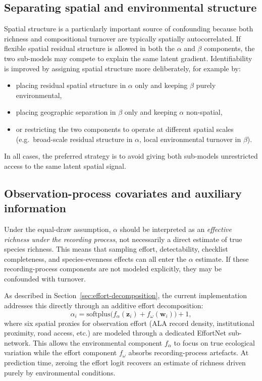 \documentclass{article}
\begin{document}
\subsection{Separating spatial and environmental structure}

Spatial structure is a particularly important source of confounding because both richness and compositional turnover are typically spatially autocorrelated. If flexible spatial residual structure is allowed in both the \(\alpha\) and \(\beta\) components, the two sub-models may compete to explain the same latent gradient. Identifiability is improved by assigning spatial structure more deliberately, for example by:
\begin{itemize}
    \item placing residual spatial structure in \(\alpha\) only and keeping \(\beta\) purely environmental,
    \item placing geographic separation in \(\beta\) only and keeping \(\alpha\) non-spatial,
    \item or restricting the two components to operate at different spatial scales (e.g.\ broad-scale residual structure in \(\alpha\), local environmental turnover in \(\beta\)).
\end{itemize}
In all cases, the preferred strategy is to avoid giving both sub-models unrestricted access to the same latent spatial signal.

\subsection{Observation-process covariates and auxiliary information}

Under the equal-draw assumption, \(\alpha\) should be interpreted as an \emph{effective richness under the recording process}, not necessarily a direct estimate of true species richness. This means that sampling effort, detectability, checklist completeness, and species-evenness effects can all enter the \(\alpha\) estimate. If these recording-process components are not modeled explicitly, they may be confounded with turnover.

As described in Section~\ref{sec:effort-decomposition}, the current implementation addresses this directly through an additive effort decomposition:
\begin{equation}
    \alpha_i = \text{softplus}\!\big(f_\alpha(\mathbf{z}_i) + f_\omega(\mathbf{w}_i)\big) + 1,
\end{equation}
where six spatial proxies for observation effort (ALA record density, institutional proximity, road access, etc.) are modeled through a dedicated EffortNet sub-network. This allows the environmental component $f_\alpha$ to focus on true ecological variation while the effort component $f_\omega$ absorbs recording-process artefacts. At prediction time, zeroing the effort logit recovers an estimate of richness driven purely by environmental conditions.
\end{document}
